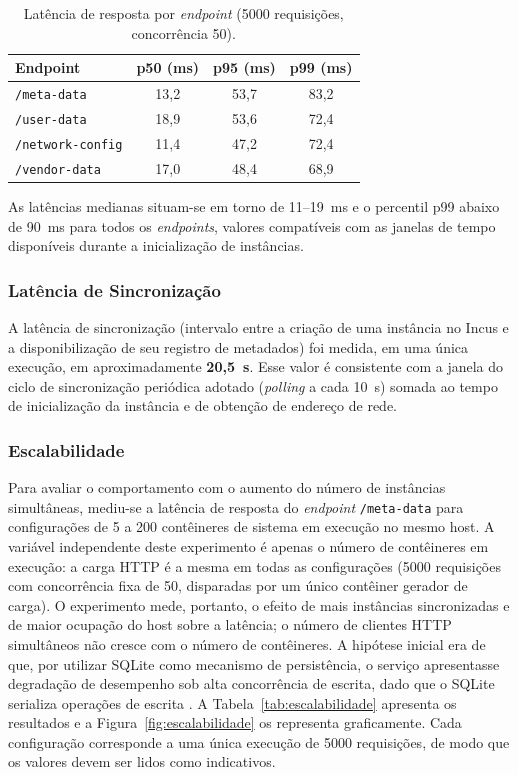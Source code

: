 \begin{table}[ht]
\centering
\caption{Latência de resposta por \textit{endpoint} (5000 requisições, concorrência 50).}
\label{tab:latencia}
\begin{tabular}{lccc}
\hline
\textbf{Endpoint} & \textbf{p50 (ms)} & \textbf{p95 (ms)} & \textbf{p99 (ms)} \\
\hline
\texttt{/meta-data}       & 13{,}2 & 53{,}7 & 83{,}2 \\
\texttt{/user-data}       & 18{,}9 & 53{,}6 & 72{,}4 \\
\texttt{/network-config}  & 11{,}4 & 47{,}2 & 72{,}4 \\
\texttt{/vendor-data}     & 17{,}0 & 48{,}4 & 68{,}9 \\
\hline
\end{tabular}
\end{table}

As latências medianas situam-se em torno de 11--19~ms e o percentil p99 abaixo de 90~ms para todos os \textit{endpoints}, valores compatíveis com as janelas de tempo disponíveis durante a inicialização de instâncias.

\subsubsection{Latência de Sincronização}

A latência de sincronização (intervalo entre a criação de uma instância no Incus e a disponibilização de seu registro de metadados) foi medida, em uma única execução, em aproximadamente \textbf{20{,}5~s}. Esse valor é consistente com a janela do ciclo de sincronização periódica adotado (\textit{polling} a cada 10~s) somada ao tempo de inicialização da instância e de obtenção de endereço de rede.

\subsubsection{Escalabilidade}

Para avaliar o comportamento com o aumento do número de instâncias simultâneas, mediu-se a latência de resposta do \textit{endpoint} \texttt{/meta-data} para configurações de 5 a 200 contêineres de sistema em execução no mesmo host. A variável independente deste experimento é apenas o número de contêineres em execução: a carga HTTP é a mesma em todas as configurações (5000 requisições com concorrência fixa de 50, disparadas por um único contêiner gerador de carga). O experimento mede, portanto, o efeito de mais instâncias sincronizadas e de maior ocupação do host sobre a latência; o número de clientes HTTP simultâneos não cresce com o número de contêineres. A hipótese inicial era de que, por utilizar SQLite como mecanismo de persistência, o serviço apresentasse degradação de desempenho sob alta concorrência de escrita, dado que o SQLite serializa operações de escrita \citep{sqlite2024}. A Tabela~\ref{tab:escalabilidade} apresenta os resultados e a Figura~\ref{fig:escalabilidade} os representa graficamente. Cada configuração corresponde a uma única execução de 5000 requisições, de modo que os valores devem ser lidos como indicativos.

